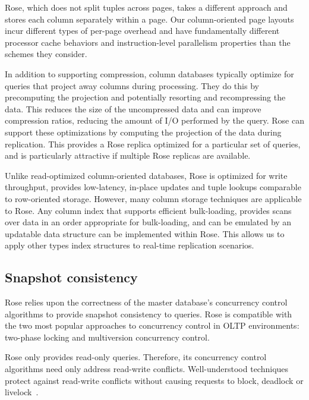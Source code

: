 \documentclass{vldb}
\newcommand{\rows}{Rose\xspace}
\begin{document}
\rows, which does not split tuples across pages, takes a different
approach and stores each column separately within a page.  Our
column-oriented page layouts incur different types of per-page overhead and
have fundamentally different processor
cache behaviors and instruction-level parallelism properties than the
schemes they consider.

In addition to supporting compression, column databases typically
optimize for queries that project away columns during processing.
They do this by precomputing the projection and potentially resorting
and recompressing the data.  This reduces the size of the uncompressed
data and can improve compression ratios, reducing the amount of I/O
performed by the query.  \rows can support these optimizations by
computing the projection of the data during replication.  This
provides a \rows replica optimized for a particular set of queries,
and is particularly attractive if multiple \rows replicas are
available.

Unlike read-optimized column-oriented databases, \rows is optimized
for write throughput, provides low-latency, in-place updates and tuple lookups comparable to row-oriented storage.
However, many column storage techniques are applicable to \rows.  Any
column index that supports efficient bulk-loading, provides scans over data in an order appropriate for bulk-loading, and can be emulated by an
updatable data structure can be implemented within
\rows.  This allows us to apply other types index structures
to real-time replication scenarios.


\subsection{Snapshot consistency}

\rows relies upon the correctness of the master database's concurrency
control algorithms to provide snapshot consistency to queries.  \rows
is compatible with the two most popular approaches to concurrency
control in OLTP environments: two-phase locking and multiversion concurrency control.

\rows only provides read-only queries.  Therefore, its concurrency
control algorithms need only address read-write conflicts.
Well-understood techniques protect against read-write conflicts
without causing requests to block, deadlock or
livelock~\cite{concurrencyControl}.
\end{document}
